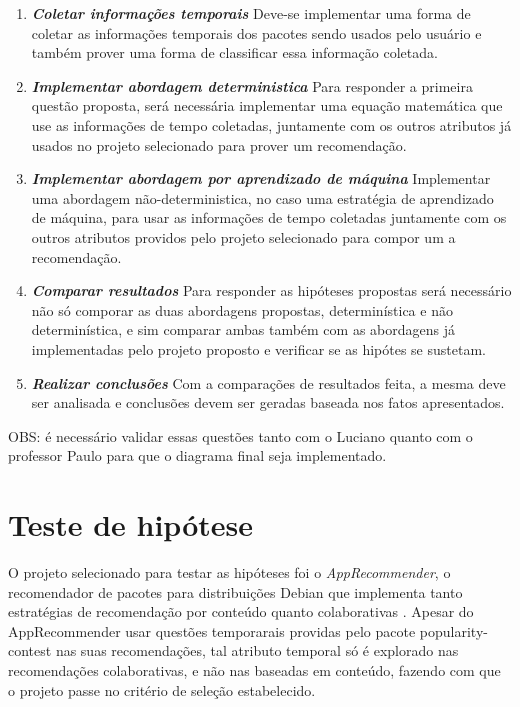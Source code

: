\begin{enumerate}
    \item \textit{\textbf{Coletar informações temporais}}
Deve-se implementar uma forma de coletar as informações temporais dos pacotes sendo usados pelo usuário e também prover uma forma de classificar essa informação coletada.

    \item \textit{\textbf{Implementar abordagem deterministica}}
Para responder a primeira questão proposta, será necessária implementar uma equação matemática que use as informações de tempo coletadas, juntamente com os outros atributos já usados no projeto selecionado para prover um recomendação.

    \item \textit{\textbf{Implementar abordagem por aprendizado de máquina}}
Implementar uma abordagem não-deterministica, no caso uma estratégia de aprendizado de máquina, para usar as informações de tempo coletadas juntamente com os outros atributos providos pelo projeto selecionado para compor um a recomendação.

    \item \textit{\textbf{Comparar resultados}}
Para responder as hipóteses propostas será necessário não só comporar as duas abordagens propostas, determinística e não determinística, e sim comparar ambas também com as abordagens já implementadas pelo projeto proposto e verificar se as hipótes se sustetam.

    \item \textit{\textbf{Realizar conclusões}}
Com a comparações de resultados feita, a mesma deve ser analisada e conclusões devem ser geradas baseada nos fatos apresentados.
\end{enumerate}

OBS: é necessário validar essas questões tanto com o Luciano quanto com o professor Paulo para que o diagrama final seja implementado.

\section{Teste de hipótese}

O projeto selecionado para testar as hipóteses foi o \textit{AppRecommender}, o recomendador de pacotes para distribuições Debian que implementa tanto estratégias de recomendação por conteúdo quanto colaborativas \cite{araujo2011apprecommender}.
Apesar do AppRecommender usar questões temporarais providas pelo pacote popularity-contest nas suas recomendações, tal atributo temporal só é explorado nas recomendações colaborativas, e não nas baseadas em conteúdo, fazendo com que o projeto passe no critério de seleção estabelecido.

